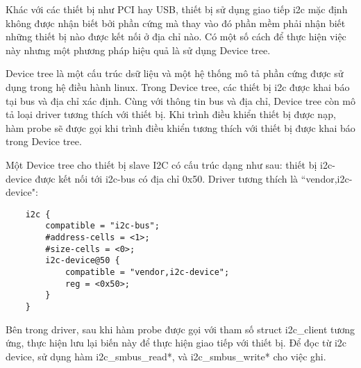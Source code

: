 
Khác với các thiết bị như PCI hay USB, thiết bị sử dụng giao tiếp \acrshort{i2c} mặc định không được nhận biết bởi phần cứng mà thay vào đó phần mềm phải nhận biết những thiết bị nào được kết nối ở địa chỉ nào. Có một số cách để thực hiện việc này nhưng một phương pháp hiệu quả là sử dụng Device tree. \cite{i2c-instance}

Device tree là một cấu trúc dsữ liệu và một hệ thống mô tả phần cứng được sử dụng trong hệ điều hành linux. Trong Device tree, các thiết bị \acrshort{i2c} được khai báo tại bus và địa chỉ xác định. Cùng với thông tin bus và địa chỉ, Device tree còn mô tả loại driver tương thích với thiết bị. Khi trình điều khiển thiết bị được nạp, hàm probe sẽ được gọi khi trình điều khiển tương thích với thiết bị được khai báo trong Device tree.

Một Device tree cho thiết bị slave I2C có cấu trúc dạng như sau: thiết bị i2c-device được kết nối tới i2c-bus có địa chỉ 0x50. Driver tương thích là “vendor,i2c-device":
\begin{lstlisting}
	i2c {
		compatible = "i2c-bus";
		#address-cells = <1>;
		#size-cells = <0>;
		i2c-device@50 {
			compatible = "vendor,i2c-device";
			reg = <0x50>;
		}
	}
\end{lstlisting}

Bên trong driver, sau khi hàm probe được gọi với tham số struct i2c\_client tương ứng, thực hiện lưu lại biến này để thực hiện giao tiếp với thiết bị. Để đọc từ i2c device, sử dụng hàm i2c\_smbus\_read*, và i2c\_smbus\_write* cho việc ghi.
